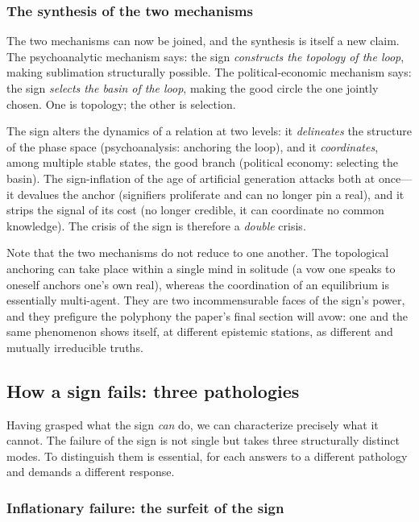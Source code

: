\subsubsection{The synthesis of the two mechanisms}

The two mechanisms can now be joined, and the synthesis is itself a new claim. The psychoanalytic mechanism says: the sign \emph{constructs the topology of the loop}, making sublimation structurally possible. The political-economic mechanism says: the sign \emph{selects the basin of the loop}, making the good circle the one jointly chosen. One is topology; the other is selection.

\begin{claim}
The sign alters the dynamics of a relation at two levels: it \emph{delineates} the structure of the phase space (psychoanalysis: anchoring the loop), and it \emph{coordinates}, among multiple stable states, the good branch (political economy: selecting the basin). The sign-inflation of the age of artificial generation attacks both at once---it devalues the anchor (signifiers proliferate and can no longer pin a real), and it strips the signal of its cost (no longer credible, it can coordinate no common knowledge). The crisis of the sign is therefore a \emph{double} crisis.
\end{claim}

Note that the two mechanisms do not reduce to one another. The topological anchoring can take place within a single mind in solitude (a vow one speaks to oneself anchors one's own real), whereas the coordination of an equilibrium is essentially multi-agent. They are two incommensurable faces of the sign's power, and they prefigure the polyphony the paper's final section will avow: one and the same phenomenon shows itself, at different epistemic stations, as different and mutually irreducible truths.

\subsection{How a sign fails: three pathologies}
\label{p09:sec:failures}

Having grasped what the sign \emph{can} do, we can characterize precisely what it cannot. The failure of the sign is not single but takes three structurally distinct modes. To distinguish them is essential, for each answers to a different pathology and demands a different response.

\subsubsection{Inflationary failure: the surfeit of the sign}

